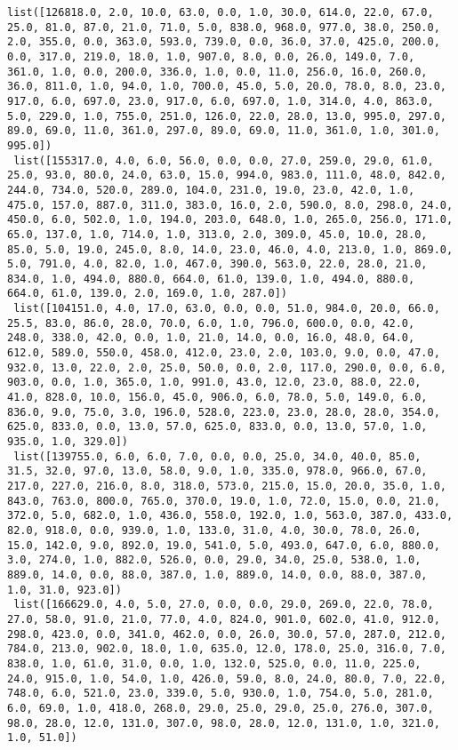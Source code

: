 \documentclass[11pt]{article}
\begin{document}
\begin{Verbatim}[commandchars=\\\{\}]
 list([126818.0, 2.0, 10.0, 63.0, 0.0, 1.0, 30.0, 614.0, 22.0, 67.0, 25.0, 81.0, 87.0, 21.0, 71.0, 5.0, 838.0, 968.0, 977.0, 38.0, 250.0, 2.0, 355.0, 0.0, 363.0, 593.0, 739.0, 0.0, 36.0, 37.0, 425.0, 200.0, 0.0, 317.0, 219.0, 18.0, 1.0, 907.0, 8.0, 0.0, 26.0, 149.0, 7.0, 361.0, 1.0, 0.0, 200.0, 336.0, 1.0, 0.0, 11.0, 256.0, 16.0, 260.0, 36.0, 811.0, 1.0, 94.0, 1.0, 700.0, 45.0, 5.0, 20.0, 78.0, 8.0, 23.0, 917.0, 6.0, 697.0, 23.0, 917.0, 6.0, 697.0, 1.0, 314.0, 4.0, 863.0, 5.0, 229.0, 1.0, 755.0, 251.0, 126.0, 22.0, 28.0, 13.0, 995.0, 297.0, 89.0, 69.0, 11.0, 361.0, 297.0, 89.0, 69.0, 11.0, 361.0, 1.0, 301.0, 995.0])
 list([155317.0, 4.0, 6.0, 56.0, 0.0, 0.0, 27.0, 259.0, 29.0, 61.0, 25.0, 93.0, 80.0, 24.0, 63.0, 15.0, 994.0, 983.0, 111.0, 48.0, 842.0, 244.0, 734.0, 520.0, 289.0, 104.0, 231.0, 19.0, 23.0, 42.0, 1.0, 475.0, 157.0, 887.0, 311.0, 383.0, 16.0, 2.0, 590.0, 8.0, 298.0, 24.0, 450.0, 6.0, 502.0, 1.0, 194.0, 203.0, 648.0, 1.0, 265.0, 256.0, 171.0, 65.0, 137.0, 1.0, 714.0, 1.0, 313.0, 2.0, 309.0, 45.0, 10.0, 28.0, 85.0, 5.0, 19.0, 245.0, 8.0, 14.0, 23.0, 46.0, 4.0, 213.0, 1.0, 869.0, 5.0, 791.0, 4.0, 82.0, 1.0, 467.0, 390.0, 563.0, 22.0, 28.0, 21.0, 834.0, 1.0, 494.0, 880.0, 664.0, 61.0, 139.0, 1.0, 494.0, 880.0, 664.0, 61.0, 139.0, 2.0, 169.0, 1.0, 287.0])
 list([104151.0, 4.0, 17.0, 63.0, 0.0, 0.0, 51.0, 984.0, 20.0, 66.0, 25.5, 83.0, 86.0, 28.0, 70.0, 6.0, 1.0, 796.0, 600.0, 0.0, 42.0, 248.0, 338.0, 42.0, 0.0, 1.0, 21.0, 14.0, 0.0, 16.0, 48.0, 64.0, 612.0, 589.0, 550.0, 458.0, 412.0, 23.0, 2.0, 103.0, 9.0, 0.0, 47.0, 932.0, 13.0, 22.0, 2.0, 25.0, 50.0, 0.0, 2.0, 117.0, 290.0, 0.0, 6.0, 903.0, 0.0, 1.0, 365.0, 1.0, 991.0, 43.0, 12.0, 23.0, 88.0, 22.0, 41.0, 828.0, 10.0, 156.0, 45.0, 906.0, 6.0, 78.0, 5.0, 149.0, 6.0, 836.0, 9.0, 75.0, 3.0, 196.0, 528.0, 223.0, 23.0, 28.0, 28.0, 354.0, 625.0, 833.0, 0.0, 13.0, 57.0, 625.0, 833.0, 0.0, 13.0, 57.0, 1.0, 935.0, 1.0, 329.0])
 list([139755.0, 6.0, 6.0, 7.0, 0.0, 0.0, 25.0, 34.0, 40.0, 85.0, 31.5, 32.0, 97.0, 13.0, 58.0, 9.0, 1.0, 335.0, 978.0, 966.0, 67.0, 217.0, 227.0, 216.0, 8.0, 318.0, 573.0, 215.0, 15.0, 20.0, 35.0, 1.0, 843.0, 763.0, 800.0, 765.0, 370.0, 19.0, 1.0, 72.0, 15.0, 0.0, 21.0, 372.0, 5.0, 682.0, 1.0, 436.0, 558.0, 192.0, 1.0, 563.0, 387.0, 433.0, 82.0, 918.0, 0.0, 939.0, 1.0, 133.0, 31.0, 4.0, 30.0, 78.0, 26.0, 15.0, 142.0, 9.0, 892.0, 19.0, 541.0, 5.0, 493.0, 647.0, 6.0, 880.0, 3.0, 274.0, 1.0, 882.0, 526.0, 0.0, 29.0, 34.0, 25.0, 538.0, 1.0, 889.0, 14.0, 0.0, 88.0, 387.0, 1.0, 889.0, 14.0, 0.0, 88.0, 387.0, 1.0, 31.0, 923.0])
 list([166629.0, 4.0, 5.0, 27.0, 0.0, 0.0, 29.0, 269.0, 22.0, 78.0, 27.0, 58.0, 91.0, 21.0, 77.0, 4.0, 824.0, 901.0, 602.0, 41.0, 912.0, 298.0, 423.0, 0.0, 341.0, 462.0, 0.0, 26.0, 30.0, 57.0, 287.0, 212.0, 784.0, 213.0, 902.0, 18.0, 1.0, 635.0, 12.0, 178.0, 25.0, 316.0, 7.0, 838.0, 1.0, 61.0, 31.0, 0.0, 1.0, 132.0, 525.0, 0.0, 11.0, 225.0, 24.0, 915.0, 1.0, 54.0, 1.0, 426.0, 59.0, 8.0, 24.0, 80.0, 7.0, 22.0, 748.0, 6.0, 521.0, 23.0, 339.0, 5.0, 930.0, 1.0, 754.0, 5.0, 281.0, 6.0, 69.0, 1.0, 418.0, 268.0, 29.0, 25.0, 29.0, 25.0, 276.0, 307.0, 98.0, 28.0, 12.0, 131.0, 307.0, 98.0, 28.0, 12.0, 131.0, 1.0, 321.0, 1.0, 51.0])

\end{Verbatim}
\end{document}
